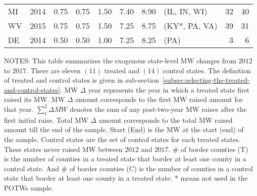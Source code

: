 \begin{table}[H]
{\begin{tabular}{lrrrrrrlrr}
            MI             & 2014             & 0.75               & 0.75                    & 1.50                     & 7.40     & 8.90   & (IL, IN, WI)   & 32                        & 40                        \\
            WV             & 2015             & 0.75               & 0.75                    & 1.50                     & 7.25     & 8.75   & (KY*, PA, VA)   & 39                        & 31                        \\
            DE             & 2014             & 0.50               & 0.50                    & 1.00                     & 7.25     & 8.25   & (PA)           & 3                         & 6                         \\ \bottomrule\bottomrule
        \end{tabular}
    }
    \begin{minipage}{17.5cm}
        \vspace{0.01in}
        \tiny NOTES: This table summarizes the exogenous state-level MW changes from $2012$ to $2017$. There are eleven $(11)$ treated and $(14)$ control states. The definition of treated and control states is given in sub-section~\ref{subsec:selecting-the-treated-and-control-states}. MW $\Delta$ year represents the year in which a treated state first raised its MW. MW $\Delta$ amount corresponds to the first MW raised amount for that year. $\sum_{1}^{2}\Delta MW$ denotes the sum of any post-two-year MW raises after the first initial raise. Total MW $\Delta$ amount corresponds to the total MW raised amount till the end of the sample. Start (End) is the MW at the start (end) of the sample. Control states are the set of control states for each treated states. These states never raised MW between $2012$ and $2017$. \# of border counties (T) is the number of counties in a treated state that border at least one county in a control state. And \# of border counties (C) is the number of counties in a control state that border at least one county in a treated state. * means not used in the POTWs sample.
    \end{minipage}
\end{table}
